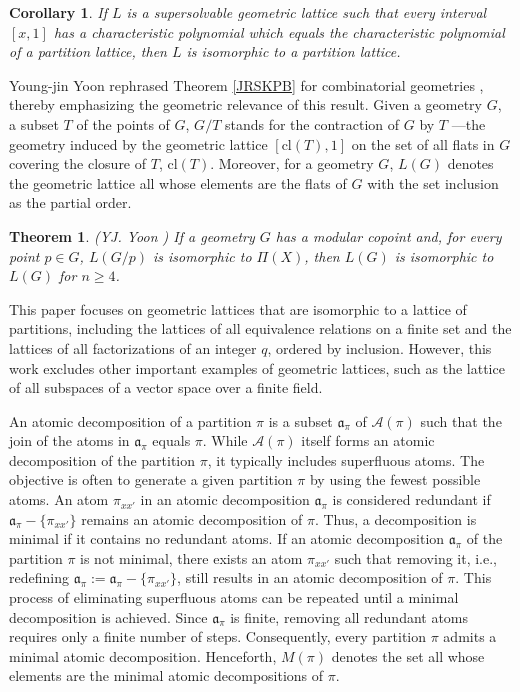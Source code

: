 \documentclass[12pt]{extarticle}
\newtheorem{Theorem}{Theorem}
\newtheorem{Corollary}{Corollary}
\begin{document}
	\begin{Corollary}
		If $L$ is a supersolvable geometric lattice such that every interval $[x,1]$ has a characteristic polynomial which equals the characteristic polynomial of a partition lattice, then $L$ is isomorphic to a partition lattice.
	\end{Corollary}
	
	Young-jin Yoon rephrased Theorem \ref{JRSKPB} for combinatorial geometries \cite{Yoon}, thereby emphasizing the geometric relevance of this result. Given a geometry $G$, a subset $T$ of the points of $G$, $G/T$ stands for the contraction of $G$ by $T$ ---the geometry induced by the geometric lattice $[\text{cl}(T), 1]$ on the set of all flats in $G$ covering the closure of $T$, $\text{cl}(T)$. Moreover, for a geometry $G$, $L(G)$   denotes the geometric lattice all whose elements are the flats of $G$ with the set inclusion as the partial order.
	
	\begin{Theorem} (YJ. Yoon \cite{Yoon})
		If a geometry $G$ has a modular copoint and, for every point $p\in G$, $L(G/p)$ is isomorphic to $\Pi(X)$, then $L(G)$ is isomorphic to $L(G)$ for $n\geq4$.
	\end{Theorem}
	
	This paper focuses on geometric lattices that are isomorphic to a lattice of partitions, including the lattices of all equivalence relations on a finite set and the lattices of all factorizations of an integer $q$, ordered by inclusion. However, this work excludes other important examples of geometric lattices, such as the lattice of all subspaces of a vector space over a finite field.  
	
	An atomic decomposition of a partition $\pi$ is a subset $\mathfrak{a}_{\pi}$ of $\mathcal{A}(\pi)$ such that the join of the atoms in $\mathfrak{a}_{\pi}$ equals $\pi$. While $\mathcal{A}(\pi)$ itself forms an atomic decomposition of the partition $\pi$, it typically includes superfluous atoms. The objective is often to generate a given partition $\pi$ by using the fewest possible atoms. An atom $\pi_{xx'}$ in an atomic decomposition $\mathfrak{a}_{\pi}$ is considered redundant if $\mathfrak{a}_{\pi}-\{\pi_{xx'}\}$ remains an atomic decomposition of $\pi$. Thus, a decomposition is minimal if it contains no redundant atoms. If an atomic decomposition $\mathfrak{a}_{\pi}$ of the partition $\pi$ is not minimal, there exists an atom $\pi_{xx'}$ such that removing it, i.e., redefining $\mathfrak{a}_{\pi}:=\mathfrak{a}_{\pi}-\{\pi_{xx'}\}$,  still results in an atomic decomposition of $\pi$. This process of eliminating superfluous atoms can be repeated until a minimal decomposition is achieved. Since $\mathfrak{a}_{\pi}$ is finite, removing all redundant atoms requires only a finite number of steps. Consequently, every partition $\pi$ admits a minimal atomic decomposition. Henceforth, $M(\pi)$ denotes the set all whose elements are the minimal atomic decompositions of $\pi$.
	
\end{document}
